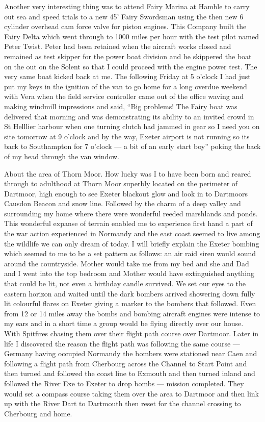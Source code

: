 Another very interesting thing was to attend Fairy Marina at Hamble to carry out
sea and speed trials to a new 45' Fairy Swordsman using the then new 6 cylinder
overhead cam force valve for piston engines. This Company built the Fairy
Delta which went through to 1000 miles per hour with the test pilot named Peter
Twist. Peter had been retained when the aircraft works closed and remained as
test skipper for the power boat division and he skippered the boat on the out
on the Solent so that I could proceed with the engine power test. The very
same boat kicked back at me. The following Friday at 5 o'clock I had just put
my keys in the ignition of the van to go home for a long overdue weekend with
Vera when the field service controller came out of the office waving and making
windmill impressions and said, ``Big problems! The Fairy boat was delivered
that morning and was demonstrating its ability to an invited crowd in St
Helllier harbour when one turning clutch had jammed in gear so I need you on
site tomorrow at 9 o'clock and by the way, Exeter airport is not running so its
back to Southampton for 7 o'clock --- a bit of an early start boy'' poking the
back of my head through the van window.





About the area of Thorn Moor. How lucky was I to have been born and reared
through to adulthood at Thorn Moor superbly located on the perimeter of
Dartmoor, high enough to see Exeter blackout glow and look in to Dartmoors
Causdon Beacon and snow line. Followed by the charm of a deep valley and
surrounding my home where there were wonderful reeded marshlands and ponds.
This wonderful expanse of terrain enabled me to experience first hand a part of
the war action experienced in Normandy and the east coast seemed to live among
the wildlife we can only dream of today. I will briefly explain the Exeter
bombing which seemed to me to be a set pattern as follows: an air raid siren
would sound around the countryside. Mother would take me from my bed and she
and Dad and I went into the top bedroom and Mother would have extinguished
anything that could be lit, not even a birthday candle survived. We set our
eyes to the eastern horizon and waited until the dark bombers arrived showering
down fully lit colourful flares on Exeter giving a marker to the bombers that
followed. Even from 12 or 14 miles away the bombs and bombing aircraft engines
were intense to my ears and in a short time a group would be flying directly
over our house. With Spitfires chasing them over their flight path course over
Dartmoor. Later in life I discovered the reason the flight path was following
the same course --- Germany having occupied Normandy the bombers were stationed
near Caen and following a flight path from Cherbourg across the Channel to
Start Point and then turned and followed the coast line to Exmouth and then
turned inland and followed the River Exe to Exeter to drop bombs --- mission
completed. They would set a compass course taking them over the area to
Dartmoor and then link up with the River Dart to Dartmouth then reset for the
channel crossing to Cherbourg and home.

